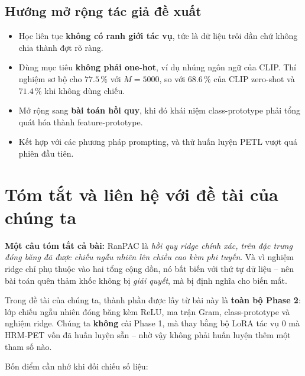 \documentclass[11pt,a4paper]{article}
\newenvironment{luuy}{\begin{leftbar}\noindent\ignorespaces}{\end{leftbar}}
\begin{document}
\subsection{Hướng mở rộng tác giả đề xuất}

\begin{itemize}[leftmargin=*]
\item Học liên tục \textbf{không có ranh giới tác vụ}, tức là dữ liệu trôi dần
      chứ không chia thành đợt rõ ràng.
\item Dùng mục tiêu \textbf{không phải one-hot}, ví dụ nhúng ngôn ngữ của CLIP.
      Thí nghiệm sơ bộ cho $77.5\,\%$ với $M = 5000$, so với $68.6\,\%$ của CLIP
      zero-shot và $71.4\,\%$ khi không dùng chiếu.
\item Mở rộng sang \textbf{bài toán hồi quy}, khi đó khái niệm class-prototype
      phải tổng quát hóa thành feature-prototype.
\item Kết hợp với các phương pháp prompting, và thử huấn luyện PETL vượt quá
      phiên đầu tiên.
\end{itemize}

\section{Tóm tắt và liên hệ với đề tài của chúng ta}

\begin{luuy}
\textbf{Một câu tóm tắt cả bài:} RanPAC là \emph{hồi quy ridge chính xác, trên
đặc trưng đóng băng đã được chiếu ngẫu nhiên lên chiều cao kèm phi tuyến}. Và vì
nghiệm ridge chỉ phụ thuộc vào hai tổng cộng dồn, nó bất biến với thứ tự dữ liệu
-- nên bài toán quên thảm khốc không bị \emph{giải quyết}, mà bị định nghĩa cho
biến mất.
\end{luuy}

Trong đề tài của chúng ta, thành phần được lấy từ bài này là \textbf{toàn bộ
Phase 2}: lớp chiếu ngẫu nhiên đóng băng kèm ReLU, ma trận Gram, class-prototype
và nghiệm ridge. Chúng ta \textbf{không} cài Phase 1, mà thay bằng bộ LoRA tác vụ
0 mà HRM-PET vốn đã huấn luyện sẵn -- nhờ vậy không phải huấn luyện thêm một tham
số nào.

Bốn điểm cần nhớ khi đối chiếu số liệu:
\end{document}
